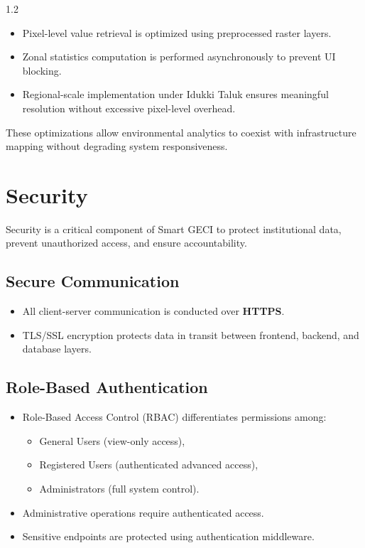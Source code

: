 \begin{spacing}{1.2}
\begin{itemize}
    \item Pixel-level value retrieval is optimized using preprocessed raster layers.
    
    \item Zonal statistics computation is performed asynchronously to prevent UI blocking.
    
    \item Regional-scale implementation under Idukki Taluk ensures meaningful
    resolution without excessive pixel-level overhead.
\end{itemize}

These optimizations allow environmental analytics to coexist with
infrastructure mapping without degrading system responsiveness.

\section{Security}

Security is a critical component of Smart GECI to protect institutional data,
prevent unauthorized access, and ensure accountability.

\subsection*{Secure Communication}

\begin{itemize}
    \item All client-server communication is conducted over \textbf{HTTPS}.
    \item TLS/SSL encryption protects data in transit between frontend,
    backend, and database layers.
\end{itemize}

\subsection*{Role-Based Authentication}

\begin{itemize}
    \item Role-Based Access Control (RBAC) differentiates permissions among:
        \begin{itemize}
            \item General Users (view-only access),
            \item Registered Users (authenticated advanced access),
            \item Administrators (full system control).
        \end{itemize}
    \item Administrative operations require authenticated access.
    \item Sensitive endpoints are protected using authentication middleware.
\end{itemize}


\end{spacing}
